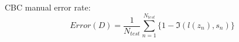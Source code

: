 
CBC manual error rate:
\[
Error(D) = \frac{1}{N_{test}} \sum_{n=1}^{N_{test}} \{ 1 - \Im(l(z_n),s_n) \}
\]


